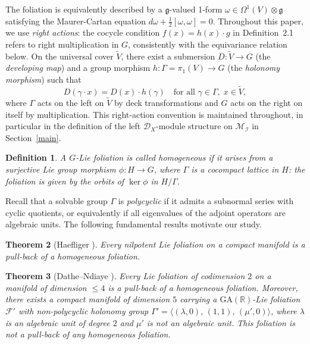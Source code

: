 \documentclass[12pt,a4paper]{article}
\newtheorem{theorem}{Theorem}[section]
\newtheorem{definition}[theorem]{Definition}
\begin{document}
The foliation is equivalently described by a $\mathfrak{g}$-valued 1-form
$\omega \in \Omega^1(V) \otimes \mathfrak{g}$ satisfying the Maurer-Cartan
equation $d\omega + \frac{1}{2}[\omega, \omega] = 0$. Throughout this paper,
we use \emph{right actions}: the cocycle condition $f(x) = h(x) \cdot g$
in Definition~2.1 refers to right multiplication in $G$, consistently with
the equivariance relation below.
On the universal cover $\widetilde{V}$, there exist a submersion
$D: \widetilde{V} \to G$ (the \emph{developing map}) and a group morphism
$h: \Gamma = \pi_1(V) \to G$ (the \emph{holonomy morphism}) such that
\[
D(\gamma \cdot x) = D(x) \cdot h(\gamma)
\quad \text{for all } \gamma \in \Gamma,\; x \in \widetilde{V},
\]
where $\Gamma$ acts on the left on $\widetilde{V}$ by deck transformations
and $G$ acts on the right on itself by multiplication. This right-action
convention is maintained throughout, in particular in the definition of the
left $\mathcal{D}_X$-module structure on $\mathcal{M}_{\mathcal{I}}$
in Section~\ref{main}.

\begin{definition}
A $G$-Lie foliation is called \emph{homogeneous} \cite{G88} if it arises from
a surjective Lie group morphism $\phi: H \to G$, where $\Gamma$ is a
cocompact lattice in $H$: the foliation is given by the orbits of $\ker\phi$
in $H/\Gamma$.
\end{definition}

Recall that a solvable group $\Gamma$ is \emph{polycyclic} if it admits a
subnormal series with cyclic quotients, or equivalently if all eigenvalues of
the adjoint operators are algebraic units. The following fundamental results
motivate our study.

\begin{theorem}[Haefliger \cite{H84}]
Every nilpotent Lie foliation on a compact manifold is a pull-back of a
homogeneous foliation.
\end{theorem}

\begin{theorem}[Dathe--Ndiaye \cite{DN11}]\label{thm:classif}
Every Lie foliation of codimension $2$ on a manifold of dimension $\leq 4$
is a pull-back of a homogeneous foliation. Moreover, there exists a compact
manifold of dimension $5$ carrying a $\mathrm{GA}(\mathbb{R})$-Lie foliation
$\mathcal{F}'$ with non-polycyclic holonomy group
$\Gamma' = \langle (\lambda,0),\,(1,1),\,(\mu',0)\rangle$,
where $\lambda$ is an algebraic unit of degree $2$ and $\mu'$ is not an
algebraic unit. This foliation is not a pull-back of any homogeneous foliation.
\end{theorem}
\end{document}
